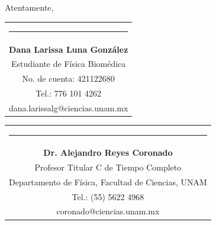 \documentclass[11pt,letterpaper]{article}
\begin{document}
	Atentamente,
	
	
	\bigskip
	
	{\vspace{2.55cm}\begin{tabular} { c}
			\setlength{\tabcolsep}{15pt}
			\renewcommand{\arraystretch}{1}
			\noindent\rule{5.5cm}{0.4pt}\qquad \\
			
			\qquad  \textbf{Dana Larissa Luna González} \qquad \\
			\qquad Estudiante de Física Biomédica  \qquad \\ \qquad 
			No. de cuenta: 421122680\qquad \\  
			\qquad  Tel.: 776 101 4262 \qquad \\
			\qquad dana.larissalg@ciencias.unam.mx \qquad \\
			
		\end{tabular}
	}
	
	{\vspace{-2.85cm}\hspace{7cm}\begin{tabular} { c}
			\setlength{\tabcolsep}{15pt}
			\renewcommand{\arraystretch}{1}
			\noindent\rule{5.5cm}{0.4pt}\qquad \\
			
			\qquad  \textbf{Dr. Alejandro Reyes Coronado} \qquad \\
			\qquad Profesor Titular C de Tiempo Completo  \qquad \\  
			\qquad Departamento de Física, Facultad de Ciencias, UNAM\qquad \\ 
			\qquad  Tel.: (55) 5622 4968 \qquad \\
			\qquad coronado@ciencias.unam.mx \qquad \\
			
		\end{tabular}
		
	}
	
	
	
	
	
	
	
	
	
	
	
	
	
	
	
	
	
	
	
	
	
	
	
	
	
	
	
	\printbibliography
	
\end{document}
